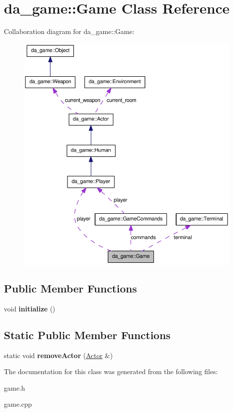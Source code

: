 \hypertarget{classda__game_1_1Game}{
\section{da\_\-game::Game Class Reference}
\label{classda__game_1_1Game}
}
Collaboration diagram for da\_\-game::Game:\nopagebreak
\begin{figure}[H]
\begin{center}
\leavevmode
\includegraphics[width=400pt]{classda__game_1_1Game__coll__graph}
\end{center}
\end{figure}
\subsection*{Public Member Functions}
\begin{DoxyCompactItemize}
\item 
\hypertarget{classda__game_1_1Game_aa88f274b8ac3f044da844a0ebc0d9070}{
void {\bfseries initialize} ()}
\label{classda__game_1_1Game_aa88f274b8ac3f044da844a0ebc0d9070}

\end{DoxyCompactItemize}
\subsection*{Static Public Member Functions}
\begin{DoxyCompactItemize}
\item 
\hypertarget{classda__game_1_1Game_a90ae0fd02e47d471a07d1e1958e6e06a}{
static void {\bfseries removeActor} (\hyperlink{classda__game_1_1Actor}{Actor} \&)}
\label{classda__game_1_1Game_a90ae0fd02e47d471a07d1e1958e6e06a}

\end{DoxyCompactItemize}


The documentation for this class was generated from the following files:\begin{DoxyCompactItemize}
\item 
game.h\item 
game.cpp\end{DoxyCompactItemize}
